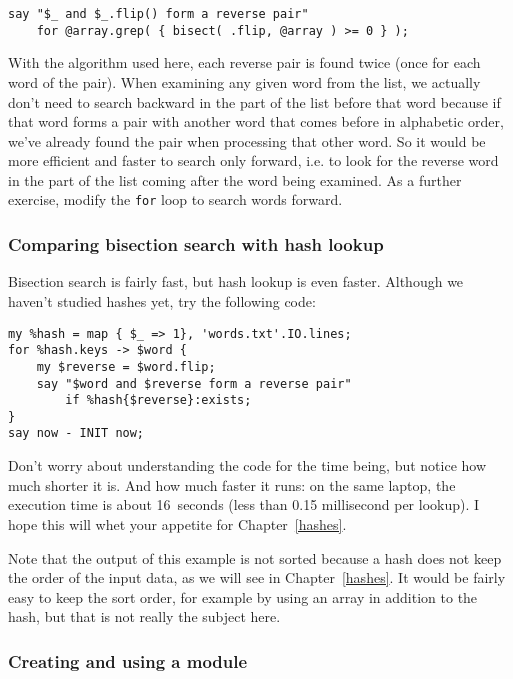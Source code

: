 \begin{verbatim}
say "$_ and $_.flip() form a reverse pair" 
    for @array.grep( { bisect( .flip, @array ) >= 0 } );
\end{verbatim}

With the algorithm used here, each reverse pair is found 
twice (once for each word of the pair). When examining 
any given word from the list, we actually don't need to 
search backward in the part of the list before that word because 
if that word forms a pair with another word that comes before in 
alphabetic order, we've already found the pair when 
processing that other word. So it would be more efficient and 
faster to search only forward, i.e. to look for the reverse 
word in the part of the list coming after the word being 
examined. As a further exercise, modify the {\tt for} loop 
to search words forward.

\subsubsection{Comparing bisection search with hash lookup}

Bisection search is fairly fast, but hash lookup is 
even faster. Although we haven't studied hashes yet, 
try the following code:

\begin{verbatim}
my %hash = map { $_ => 1}, 'words.txt'.IO.lines;
for %hash.keys -> $word {
    my $reverse = $word.flip;
    say "$word and $reverse form a reverse pair" 
        if %hash{$reverse}:exists;
}
say now - INIT now;
\end{verbatim}

Don't worry about understanding the code for the time 
being, but notice how much shorter it is. And how much 
faster it runs: on the same laptop, the execution time is 
about 16~seconds (less than 0.15 millisecond per lookup). 
I hope this will whet your appetite for Chapter~\ref{hashes}.

Note that the output of this example is not sorted because 
a hash does not keep the order of the input data, as we 
will see in Chapter~\ref{hashes}. It would be fairly easy to 
keep the sort order, for example by using an array in 
addition to the hash, but that is not really the 
subject here.

\subsubsection{Creating and using a module}

